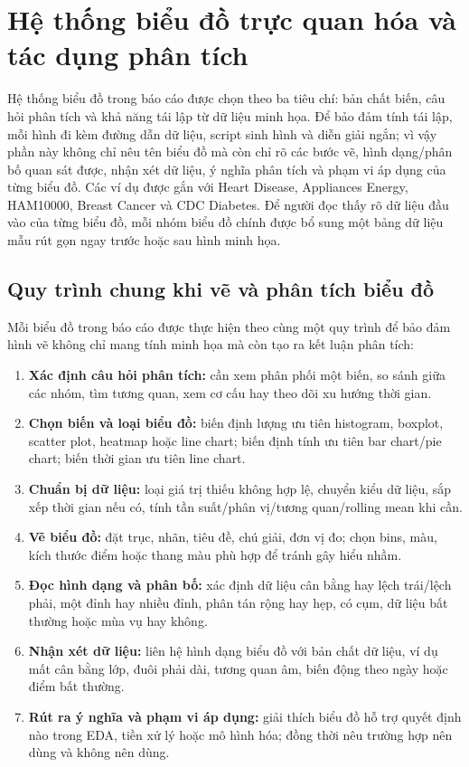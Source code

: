 \FloatBarrier

\section{Hệ thống biểu đồ trực quan hóa và tác dụng phân tích}

Hệ thống biểu đồ trong báo cáo được chọn theo ba tiêu chí: bản chất biến, câu hỏi phân tích và khả năng tái lập từ dữ liệu minh họa. Để bảo đảm tính tái lập, mỗi hình đi kèm đường dẫn dữ liệu, script sinh hình và diễn giải ngắn; vì vậy phần này không chỉ nêu tên biểu đồ mà còn chỉ rõ các bước vẽ, hình dạng/phân bố quan sát được, nhận xét dữ liệu, ý nghĩa phân tích và phạm vi áp dụng của từng biểu đồ. Các ví dụ được gắn với Heart Disease, Appliances Energy, HAM10000, Breast Cancer và CDC Diabetes. Để người đọc thấy rõ dữ liệu đầu vào của từng biểu đồ, mỗi nhóm biểu đồ chính được bổ sung một bảng dữ liệu mẫu rút gọn ngay trước hoặc sau hình minh họa.

\subsection{Quy trình chung khi vẽ và phân tích biểu đồ}

Mỗi biểu đồ trong báo cáo được thực hiện theo cùng một quy trình để bảo đảm hình vẽ không chỉ mang tính minh họa mà còn tạo ra kết luận phân tích:

\begin{enumerate}[leftmargin=2.2em,label=\textbf{\arabic*.}]
 \item \textbf{Xác định câu hỏi phân tích:} cần xem phân phối một biến, so sánh giữa các nhóm, tìm tương quan, xem cơ cấu hay theo dõi xu hướng thời gian.
 \item \textbf{Chọn biến và loại biểu đồ:} biến định lượng ưu tiên histogram, boxplot, scatter plot, heatmap hoặc line chart; biến định tính ưu tiên bar chart/pie chart; biến thời gian ưu tiên line chart.
 \item \textbf{Chuẩn bị dữ liệu:} loại giá trị thiếu không hợp lệ, chuyển kiểu dữ liệu, sắp xếp thời gian nếu có, tính tần suất/phân vị/tương quan/rolling mean khi cần.
 \item \textbf{Vẽ biểu đồ:} đặt trục, nhãn, tiêu đề, chú giải, đơn vị đo; chọn bins, màu, kích thước điểm hoặc thang màu phù hợp để tránh gây hiểu nhầm.
 \item \textbf{Đọc hình dạng và phân bố:} xác định dữ liệu cân bằng hay lệch trái/lệch phải, một đỉnh hay nhiều đỉnh, phân tán rộng hay hẹp, có cụm, dữ liệu bất thường hoặc mùa vụ hay không.
 \item \textbf{Nhận xét dữ liệu:} liên hệ hình dạng biểu đồ với bản chất dữ liệu, ví dụ mất cân bằng lớp, đuôi phải dài, tương quan âm, biến động theo ngày hoặc điểm bất thường.
 \item \textbf{Rút ra ý nghĩa và phạm vi áp dụng:} giải thích biểu đồ hỗ trợ quyết định nào trong EDA, tiền xử lý hoặc mô hình hóa; đồng thời nêu trường hợp nên dùng và không nên dùng.
\end{enumerate}

